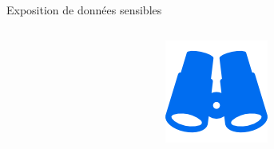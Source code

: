 \documentclass[final,hyperref={pdfpagelabels=false}]{beamer}
\begin{document}
\begin{frame}[t]
\begin{columns}[t]
\begin{column}{.465\textwidth}
\begin{block}{Exposition de données sensibles}
	\begin{columns}[T]

		\begin{column}{.01\textwidth}
		\end{column}
		\begin{column}{.115\textwidth} %
			\includegraphics[scale=1.35]{binoculars.png}
		\end{column}


\end{columns}
\end{block}
\end{column}
\end{columns}
\end{frame}
\end{document}
